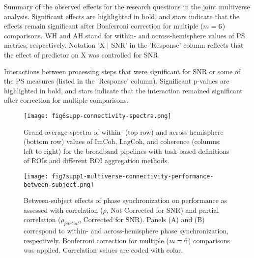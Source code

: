 \begin{table}[htbp]
    \small
    \centering
    \resizebox{\linewidth}{!}{\multiverseRestSummary}
    \caption{Summary of the observed effects for the research questions in the joint multiverse analysis. Significant effects are highlighted in bold, and stars indicate that the effects remain significant after Bonferroni correction for multiple ($m = 6$) comparisons. WH and AH stand for within- and across-hemisphere values of PS metrics, respectively. Notation 'X $|$ SNR' in the 'Response' column reflects that the effect of predictor on X was controlled for SNR.}
    \label{tab:multiverse_effects_summary}
\end{table}

\begin{table}[htbp]
    \centering
    \resizebox{\linewidth}{!}{\pipelineEffectsInteractionSummary}
    \caption{Interactions between processing steps that were significant for SNR or some of the PS measures (listed in the 'Response' column). Significant p-values are highlighted in bold, and stars indicate that the interaction remained significant after correction for multiple comparisons.}
    \label{tab:pipeline_effects_interactions}
\end{table}

\begin{figure}[htbp]
    \centering
    \texttt{[image: fig6supp-connectivity-spectra.png]}
    \caption{Grand average spectra of within- (top row) and across-hemisphere (bottom row) values of ImCoh, LagCoh, and coherence (columns: left to right) for the broadband pipelines with task-based definitions of ROIs and different ROI aggregation methods.}
    \label{fig:multiverse_connectivity_spectra}
\end{figure}

\begin{figure}[htbp]
    \centering
    \texttt{[image: fig7supp1-multiverse-connectivity-performance-between-subject.png]}
    \caption{Between-subject effects of phase synchronization on performance as assessed with correlation ($\rho$, Not Corrected for SNR) and partial correlation ($\rho_{partial}$, Corrected for SNR). Panels (A) and (B) correspond to within- and across-hemisphere phase synchronization, respectively. Bonferroni correction for multiple ($m = 6$) comparisons was applied. Correlation values are coded with color.}
    \label{fig:multiverse_connectivity_performance_between}
\end{figure}

